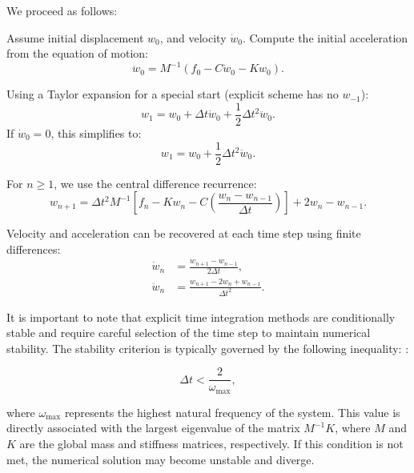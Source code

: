 \documentclass{article}
\begin{document}
	We proceed as follows:
	

	Assume initial displacement \( {w}_0 \), and velocity \( \dot{{w}}_0 \). Compute the initial acceleration from the equation of motion:
	\begin{equation}
		\ddot{{w}}_0 = {M}^{-1} \left( {f}_0 - {C} \dot{{w}}_0 - {K} {w}_0 \right).
	\end{equation}
	
Using a Taylor expansion for a special start (explicit scheme has no \( {w}_{-1} \)):
	\begin{equation}
		{w}_1 = {w}_0 + \Delta t \dot{{w}}_0 + \frac{1}{2} \Delta t^2 \ddot{{w}}_0.
	\end{equation}
	If \( \dot{{w}}_0 = 0 \), this simplifies to:
	\begin{equation}
		{w}_1 = {w}_0 + \frac{1}{2} \Delta t^2 \ddot{{w}}_0.
	\end{equation}
	
For \( n \geq 1 \), we use the central difference recurrence:
	\begin{equation}
		{w}_{n+1} = \Delta t^2 {M}^{-1} \left[ {f}_n - {K} {w}_n - {C} \left( \frac{{w}_n - {w}_{n-1}}{\Delta t} \right) \right] + 2{w}_n - {w}_{n-1}.
	\end{equation}
	
Velocity and acceleration can be recovered at each time step using finite differences:
	\begin{align}
		\dot{{w}}_n &= \frac{{w}_{n+1} - {w}_{n-1}}{2\Delta t}, \\
		\ddot{{w}}_n &= \frac{{w}_{n+1} - 2{w}_n + {w}_{n-1}}{\Delta t^2}.
	\end{align}
	
	
	It is important to note that explicit time integration methods are conditionally stable and require careful selection of the time step to maintain numerical stability. The stability criterion is typically governed by the following inequality:
	:
	
	\begin{equation}
		\Delta t < \frac{2}{\omega_{\max}},
	\end{equation}
	
	where \( \omega_{\max} \) represents the highest natural frequency of the system. This value is directly associated with the largest eigenvalue of the matrix \( {M}^{-1} {K} \), where \( {M} \) and \( {K} \) are the global mass and stiffness matrices, respectively. If this condition is not met, the numerical solution may become unstable and diverge.
	
\end{document}
